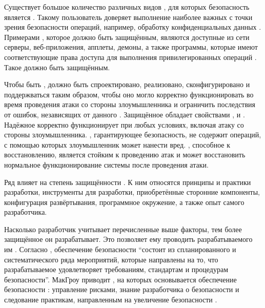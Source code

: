 %
Существует большое количество различных видов , для которых безопасность является . 
%
Такому  пользователь доверяет выполнение наиболее важных с точки зрения безопасности операций, например, обработку конфиденциальных данных . 
%
Примерами , которое должно быть защищённым, являются доступные из сети серверы, веб-приложения, апплеты, демоны, а также программы, которые имеют соответствующие права доступа для выполнения привилегированных операций . 
%
Такое  должно быть защищённым.

%
Чтобы быть ,  должно быть спроектировано, реализовано, сконфигурировано и поддержваться таким образом, чтобы оно могло корректно функционировать во время проведения атаки со стороны злоумышленника и ограничить последствия от ошибок, независящих от данного  . 
%
Защищённое  обладает свойствами ,  и  . 
%
Надёжное  корректно функционирует при любых условиях, включая атаку со стороны злоумышленника. 
%
, гарантирующее безопасность, не содержит операций, с помощью которых злоумышленник может нанести вред. 
%
, способное к восстановлению, является стойким к проведению атак и может восстановить нормальное функционирование системы после проведения атаки.

%
Ряд  влияет на степень защищённости  . 
%
К ним относятся принципы и практики разработки, инструменты для разработки, приобретённые сторонние компоненты, конфигурация развёртывания, программное окружение, а также опыт самого разработчика.

%
Насколько разработчик учитывает перечисленные выше факторы, тем более защищённое  он разрабатывает. 
%
Это позволяет ему проводить  разрабатываемого им . 
%
Согласно , обеспечение безопасности  ``состоит из спланированного и систематического ряда мероприятий, которые направлены на то, что разрабатываемое  удовлетворяет требованиям, стандартам и процедурам безопасности''.
%
МакГроу приводит , на которых основывается обеспечение безопасности : управление рисками, знание разработчика о безопасности и следование практикам, направленным на увеличение безопасности .

